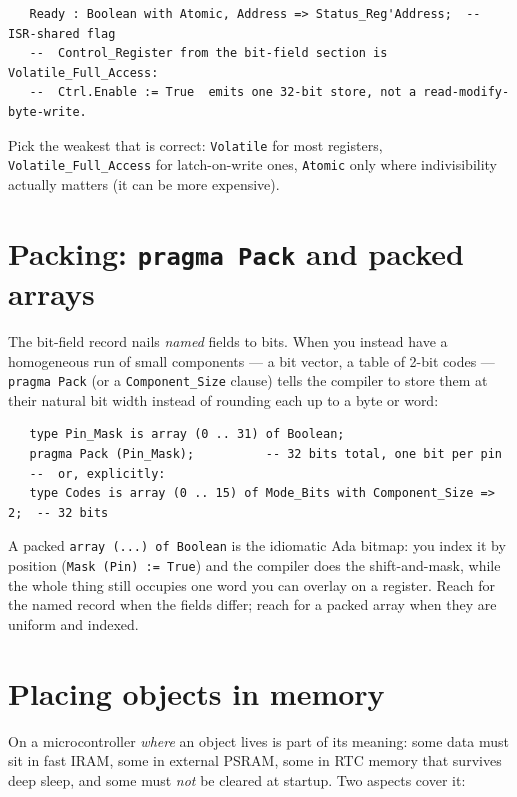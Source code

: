 \begin{lstlisting}
   Ready : Boolean with Atomic, Address => Status_Reg'Address;  -- ISR-shared flag
   --  Control_Register from the bit-field section is Volatile_Full_Access:
   --  Ctrl.Enable := True  emits one 32-bit store, not a read-modify-byte-write.
\end{lstlisting}

Pick the weakest that is correct: \texttt{Volatile} for most registers,
\texttt{Volatile\_Full\_Access} for latch-on-write ones, \texttt{Atomic} only
where indivisibility actually matters (it can be more expensive).

\section{Packing: \texttt{pragma Pack} and packed arrays}
\label{sec:pack}

The bit-field record nails \emph{named} fields to bits. When you instead have a
homogeneous run of small components --- a bit vector, a table of 2-bit codes ---
\texttt{pragma Pack} (or a \texttt{Component\_Size} clause) tells the compiler to
store them at their natural bit width instead of rounding each up to a byte or
word:

\begin{lstlisting}
   type Pin_Mask is array (0 .. 31) of Boolean;
   pragma Pack (Pin_Mask);          -- 32 bits total, one bit per pin
   --  or, explicitly:
   type Codes is array (0 .. 15) of Mode_Bits with Component_Size => 2;  -- 32 bits
\end{lstlisting}

A packed \texttt{array (...) of Boolean} is the idiomatic Ada bitmap: you index
it by position (\texttt{Mask (Pin) := True}) and the compiler does the
shift-and-mask, while the whole thing still occupies one word you can overlay on
a register. Reach for the named record when the fields differ; reach for a packed
array when they are uniform and indexed.

\section{Placing objects in memory}
\label{sec:placement}

On a microcontroller \emph{where} an object lives is part of its meaning: some
data must sit in fast IRAM, some in external PSRAM, some in RTC memory that
survives deep sleep, and some must \emph{not} be cleared at startup. Two aspects
cover it:

